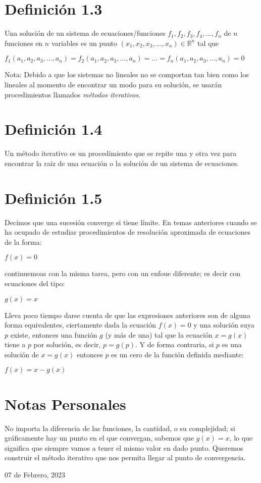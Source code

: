 \documentclass[12pt]{article}
\begin{document}
    \section*{Definición 1.3}
    Una solución de un sistema de ecuaciones/funciones $f_{1}, f_{2}, f_{3}, f_{4}, \dots, f_{n}$ de $n$ funciones en $n$ variables es un punto $(x_{1}, x_{2}, x_{3}, \dots, x_{n}) \in \mathbb{R}^{n}$ tal que 
    \begin{center}
        $f_{1}(a_{1}, a_{2}, a_{3}, \dots, a_{n}) = f_{2}(a_{1}, a_{2}, a_{3}, \dots, a_{n}) = \dots = f_{n}(a_{1}, a_{2}, a_{3}, \dots, a_{n}) = 0  $
    \end{center}
    \small{Nota: Debido a que los sistemas no lineales no se comportan tan bien como los lineales al momento de encontrar un modo para su solución, se usarán procedimientos llamados \it{métodos iterativos}.}
    \section*{Definición 1.4}
    Un método iterativo es un procedimiento que se repite una y otra vez para encontrar la raíz de una ecuación o la solución de un sistema de ecuaciones.
    \section*{Definición 1.5}
    Decimos que una sucesión converge si tiene límite.
    En temas anteriores cuando se ha ocupado de estudiar procedimientos de resolución aproximada de ecuaciones de la forma:
    \begin{center}
        $f(x) = 0$
    \end{center}
    continuemoas con la misma tarea, pero con un enfoue diferente; es decir con ecuaciones del tipo:
    \begin{center}
        $g(x) = x$
    \end{center}
    Lleva poco tiempo darse cuenta de que las expresiones anteriores son de alguna forma equivalentes, ciertamente dada la ecuación $f(x) = 0$ y una solución suya $p$ existe, entonces una función $g$ (y más de una) tal que la ecuación $x=g(x)$ tiene a $p$ por solución, es decir, $p=g(p)$. Y de forma contraria, si $p$ es una solución de $x=g(x)$ entonces $p$ es un cero de la función definida mediante:
    \begin{center}
        $f(x) = x - g(x)$
    \end{center}
    \section*{Notas Personales}
    No importa la diferencia de las funciones, la cantidad, o su complejidad; si gráficamente hay un punto en el que convergan, sabemos que $g(x)=x$, lo que significa que siempre vamos a tener el mismo valor en dado punto.
    Queremos construir el método iterativo que nos permita llegar al punto de convergencia.
    \newpage
    \begin{flushright}
        07 de Febrero, 2023
    \end{flushright}
\end{document}
